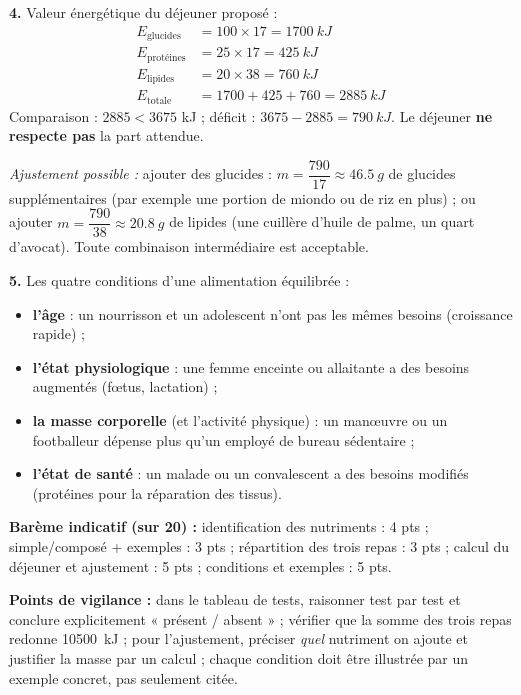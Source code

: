 \documentclass[11pt]{article}
\begin{document}
\begin{corrige}
\textbf{4.} Valeur énergétique du déjeuner proposé :
\begin{align*}
E_{\text{glucides}} &= 100 \times 17 = \SI{1700}{kJ}\\
E_{\text{protéines}} &= 25 \times 17 = \SI{425}{kJ}\\
E_{\text{lipides}} &= 20 \times 38 = \SI{760}{kJ}\\
E_{\text{totale}} &= 1700 + 425 + 760 = \SI{2885}{kJ}
\end{align*}
Comparaison : $2885 < 3675$ kJ ; déficit : $3675 - 2885 = \SI{790}{kJ}$. Le déjeuner \textbf{ne respecte pas} la part attendue.

\emph{Ajustement possible :} ajouter des glucides : $m = \dfrac{790}{17} \approx \SI{46,5}{g}$ de glucides supplémentaires (par exemple une portion de miondo ou de riz en plus) ; ou ajouter $m = \dfrac{790}{38} \approx \SI{20,8}{g}$ de lipides (une cuillère d'huile de palme, un quart d'avocat). Toute combinaison intermédiaire est acceptable.

\textbf{5.} Les quatre conditions d'une alimentation équilibrée :
\begin{itemize}
\item \textbf{l'âge} : un nourrisson et un adolescent n'ont pas les mêmes besoins (croissance rapide) ;
\item \textbf{l'état physiologique} : une femme enceinte ou allaitante a des besoins augmentés (fœtus, lactation) ;
\item \textbf{la masse corporelle} (et l'activité physique) : un manœuvre ou un footballeur dépense plus qu'un employé de bureau sédentaire ;
\item \textbf{l'état de santé} : un malade ou un convalescent a des besoins modifiés (protéines pour la réparation des tissus).
\end{itemize}

\textbf{Barème indicatif (sur 20) :} identification des nutriments : 4 pts ; simple/composé + exemples : 3 pts ; répartition des trois repas : 3 pts ; calcul du déjeuner et ajustement : 5 pts ; conditions et exemples : 5 pts.

\textbf{Points de vigilance :} dans le tableau de tests, raisonner test par test et conclure explicitement « présent / absent » ; vérifier que la somme des trois repas redonne \SI{10500}{kJ} ; pour l'ajustement, préciser \emph{quel} nutriment on ajoute et justifier la masse par un calcul ; chaque condition doit être illustrée par un exemple concret, pas seulement citée.
\end{corrige}
\end{document}
